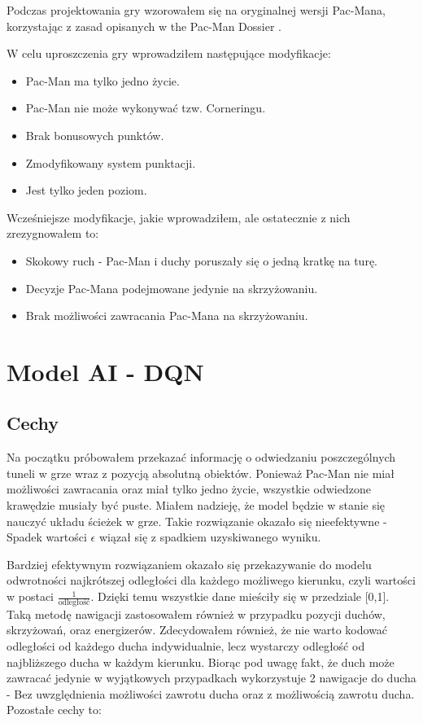 \documentclass[12pt, draft]{report}
\begin{document}
Podczas projektowania gry wzorowałem się na oryginalnej wersji Pac-Mana, korzystając z zasad opisanych w the Pac-Man Dossier \cite{ThePacmanDossier}.


W celu uproszczenia gry wprowadziłem następujące modyfikacje:
\begin{itemize}
    \item Pac-Man ma tylko jedno życie.
    \item Pac-Man nie może wykonywać tzw. Corneringu.
    \item Brak bonusowych punktów.
    \item Zmodyfikowany system punktacji.
    \item Jest tylko jeden poziom.
\end{itemize} 


Wcześniejsze modyfikacje, jakie wprowadziłem, ale ostatecznie z nich zrezygnowałem to:
\begin{itemize}
    \item Skokowy ruch - Pac-Man i duchy poruszały się o jedną kratkę na turę.
    \item Decyzje Pac-Mana podejmowane jedynie na skrzyżowaniu.
    \item Brak możliwości zawracania Pac-Mana na skrzyżowaniu.
\end{itemize}

\section{Model AI - DQN}
\subsection{Cechy}
Na początku próbowałem przekazać informację o odwiedzaniu poszczególnych tuneli w grze wraz z pozycją absolutną obiektów. Ponieważ Pac-Man nie miał możliwości zawracania oraz miał tylko jedno życie, wszystkie odwiedzone krawędzie musiały być puste. 
Miałem nadzieję, że model będzie w stanie się nauczyć układu ścieżek w grze. Takie rozwiązanie okazało się nieefektywne - Spadek wartości $\epsilon$ wiązał się z spadkiem uzyskiwanego wyniku.

Bardziej efektywnym rozwiązaniem okazało się przekazywanie do modelu odwrotności najkrótszej odległości dla każdego możliwego kierunku, czyli wartości w postaci $\frac{1}{\text{odległość}}$. Dzięki temu wszystkie dane mieściły się w przedziale [0,1]. Taką metodę nawigacji zastosowałem również w przypadku pozycji duchów, skrzyżowań, oraz energizerów.
Zdecydowałem również, że nie warto kodować odległości od każdego ducha indywidualnie, lecz wystarczy odległość od najbliższego ducha w każdym kierunku.
Biorąc pod uwagę fakt, że duch może zawracać jedynie w wyjątkowych przypadkach wykorzystuje 2 nawigacje do ducha - Bez uwzględnienia możliwości zawrotu ducha oraz z możliwością zawrotu ducha.
Pozostałe cechy to:
\end{document}
